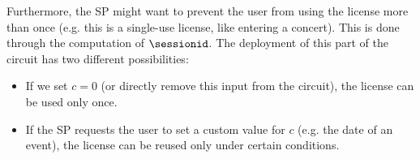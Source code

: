 \begin{enumerate}
\end{enumerate}
	

Furthermore, the SP might want to prevent the user from using the license more than once (e.g. this is a single-use license, like entering a concert). This is done through the computation of $\sessionid$. The deployment of this part of the circuit has two different possibilities:
\begin{itemize}
	\item If we set $c = 0$ (or directly remove this input from the circuit), the license can be used only once.
	\item If the SP requests the user to set a custom value for $c$ (e.g. the date of an event), the license can be reused only under certain conditions.
\end{itemize}

